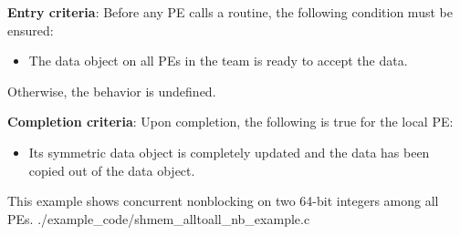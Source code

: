\begin{apidefinition}
{    {\bf Entry criteria}: Before any \ac{PE} calls a  routine,
    the following condition must be ensured:
    \begin{itemize}
    \item The  data object on all \acp{PE} in the team is
      ready to accept the  data.
    \end{itemize}
    Otherwise, the behavior is undefined.

    {\bf Completion criteria}: Upon completion, the following is true for
    the local PE:
    \begin{itemize}
    \item Its  symmetric data object is completely updated and
    the data has been copied out of the  data object.
    \end{itemize}
}


\begin{apiexamples}

\apicexample
    {This \CorCpp{} example shows concurrent nonblocking  on two 64-bit integers among all \acp{PE}.}
    {./example_code/shmem_alltoall_nb_example.c}
    {}

\end{apiexamples}

\end{apidefinition}
